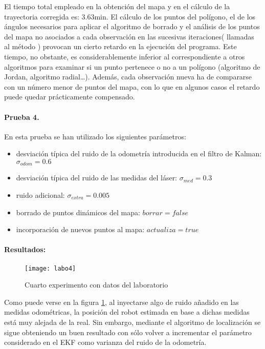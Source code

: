 El tiempo total empleado en la obtención del mapa y en el cálculo de la trayectoria corregida es: 3.63min. El cálculo de los puntos del polígono, el de los ángulos necesarios para aplicar el algoritmo de borrado y el análisis de los puntos del mapa no asociados a cada observación en las sucesivas iteraciones( llamadas al método ) provocan un cierto retardo en la ejecución del programa. Este tiempo, no obstante, es considerablemente inferior al correspondiente a otros algoritmos para examinar si un punto pertenece o no a un polígono (algoritmo de Jordan, algoritmo radial\ldots). Además, cada observación nueva ha de compararse con un número menor de puntos del mapa, con lo que en algunos casos el retardo puede quedar prácticamente compensado.

\paragraph{Prueba 4.} 
En esta prueba se han utilizado los siguientes parámetros:

\begin{itemize}
  \item desviación típica del ruido de la odometría introducida en el filtro de Kalman: $\sigma_{odom} = 0.6$
  \item desviación típica del ruido de las medidas del láser: $\sigma_{med} = 0.3$
  \item ruido adicional: $\sigma_{extra} = 0.005$
  \item borrado de puntos dinámicos del mapa: $borrar = false$
  \item incorporación de nuevos puntos al mapa: $actualiza = true$
\end{itemize}

\paragraph{Resultados:}

\begin{figure}[h]
  \centering\texttt{[image: labo4]}\\
  \caption{Cuarto experimento con datos del laboratorio}\label{fg:labo4}
\end{figure}

Como puede verse en la figura \ref{fg:labo4}, al inyectarse algo de ruido añadido en las medidas odométricas, la posición del robot estimada en base a dichas medidas está muy alejada de la real. Sin embargo, mediante el algoritmo de localización se sigue obteniendo un buen resultado con sólo volver a incrementar el parámetro considerado en el EKF como varianza del ruido de la odometría.

